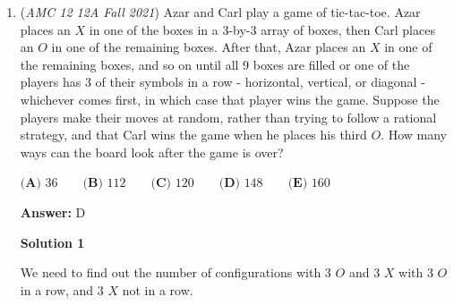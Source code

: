 \begin{enumerate}
 Therefore,
 \begin{align*} {\textrm Area} \ ABCD & = {\textrm Area} \ \triangle ABC + {\textrm Area} \ \triangle  ADC \\ & = \frac{1}{2} AC \cdot BY + \frac{1}{2} AC \cdot DX \\ & = \frac{1}{2} AC \left( BY + DY \right) \\ & = 3 \sqrt{35} . \end{align*}


 Therefore, the answer is $\boxed{\textbf{(C)} \: 3\sqrt{35}}$.

 



\textbf{Solution 3}

Since both $\overline{BY}$ and $\overline{DX}$ are perpendicular to $\overline{AC}$, we have $BD^2=XY^2+(BY+DX)^2$.

 Since the trapezoid is equilateral, $BD=AC=6$. Hence, $BY+DX=\sqrt{6^2-1^2}=\sqrt{35}$.

 Notice that both triangles $ABC$ and $ADC$ share a common base $\overline{AC}$.

 Therefore, 
 \[[ABCD]=[ABC]+[ADC]=\frac{1}{2}AC\cdot(BY+DX)=\frac{1}{2}\cdot6\cdot\sqrt{35}=\boxed{\textbf{(C)} \: 3\sqrt{35}}.\]~RunyangWang

 


	\item (\textit{AMC 12 12A Fall 2021}) Azar and Carl play a game of tic-tac-toe. Azar places an $X$ in one of the boxes in a $3$-by-$3$ array of boxes, then Carl places an $O$ in one of the remaining boxes. After that, Azar places an $X$ in one of the remaining boxes, and so on until all 9 boxes are filled or one of the players has 3 of their symbols in a row - horizontal, vertical, or diagonal - whichever comes first, in which case that player wins the game. Suppose the players make their moves at random, rather than trying to follow a rational strategy, and that Carl wins the game when he places his third $O$. How many ways can the board look after the game is over?


 $\textbf{(A) } 36 \qquad\textbf{(B) } 112 \qquad\textbf{(C) } 120 \qquad\textbf{(D) } 148 \qquad\textbf{(E) } 160$

 \textbf{Answer: }D



\textbf{Solution 1}

We need to find out the number of configurations with 3 $O$ and 3 $X$ with 3 $O$ in a row, and 3 $X$ not in a row.


\end{enumerate}
